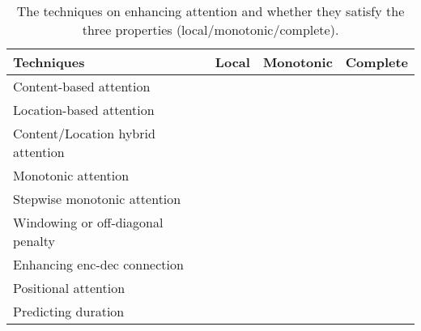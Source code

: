 \documentclass{article}
\begin{document}
\begin{table}[h]
\small
	\caption{The techniques on enhancing attention and whether they  satisfy the three properties (local/monotonic/complete).}
	\centering
	\begin{tabular}{l | c | c | c }
		\toprule
	    Techniques & Local & Monotonic & Complete \\
		\midrule
	    Content-based attention & \texttimes & \texttimes & \texttimes \\
	    Location-based attention & \texttimes & \checkmark & \texttimes \\ 
		Content/Location hybrid attention & \texttimes & \checkmark & \texttimes \\ 
		Monotonic attention & \checkmark & \checkmark & \texttimes \\
		Stepwise monotonic attention & \checkmark & \checkmark & \checkmark \\
		Windowing or off-diagonal penalty & \texttimes & \texttimes & \texttimes \\ 
		Enhancing enc-dec connection & \texttimes & \texttimes & \texttimes \\ 
		Positional attention & \texttimes & \texttimes & \texttimes \\ 
		\midrule
		Predicting duration & \checkmark & \checkmark & \checkmark \\
		\bottomrule
	\end{tabular}
	\label{tab_enhance_attention}
\end{table}
\end{document}
